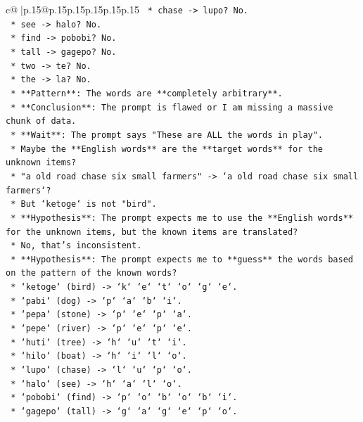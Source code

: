 \documentclass{article}
\begin{document}
{\begin{supertabular}{c@{$\;$}|p{.15\linewidth}@{}p{.15\linewidth}p{.15\linewidth}p{.15\linewidth}p{.15\linewidth}p{.15\linewidth}}
{{{\texttt{    *   chase {-}> lupo? No.} \\
\texttt{    *   see {-}> halo? No.} \\
\texttt{    *   find {-}> pobobi? No.} \\
\texttt{    *   tall {-}> gagepo? No.} \\
\texttt{    *   two {-}> te? No.} \\
\texttt{    *   the {-}> la? No.} \\
\texttt{    *   **Pattern**: The words are **completely arbitrary**.} \\
\texttt{    *   **Conclusion**: The prompt is flawed or I am missing a massive chunk of data.} \\
\texttt{    *   **Wait**: The prompt says "These are ALL the words in play".} \\
\texttt{    *   Maybe the **English words** are the **target words** for the unknown items?} \\
\texttt{    *   "a old road chase six small farmers" {-}> `a old road chase six small farmers`?} \\
\texttt{    *   But `ketoge` is not "bird".} \\
\texttt{    *   **Hypothesis**: The prompt expects me to use the **English words** for the unknown items, but the known items are translated?} \\
\texttt{    *   No, that's inconsistent.} \\
\texttt{    *   **Hypothesis**: The prompt expects me to **guess** the words based on the pattern of the known words?} \\
\texttt{    *   `ketoge` (bird) {-}> `k` `e` `t` `o` `g` `e`.} \\
\texttt{    *   `pabi` (dog) {-}> `p` `a` `b` `i`.} \\
\texttt{    *   `pepa` (stone) {-}> `p` `e` `p` `a`.} \\
\texttt{    *   `pepe` (river) {-}> `p` `e` `p` `e`.} \\
\texttt{    *   `huti` (tree) {-}> `h` `u` `t` `i`.} \\
\texttt{    *   `hilo` (boat) {-}> `h` `i` `l` `o`.} \\
\texttt{    *   `lupo` (chase) {-}> `l` `u` `p` `o`.} \\
\texttt{    *   `halo` (see) {-}> `h` `a` `l` `o`.} \\
\texttt{    *   `pobobi` (find) {-}> `p` `o` `b` `o` `b` `i`.} \\
\texttt{    *   `gagepo` (tall) {-}> `g` `a` `g` `e` `p` `o`.} \\
}}}
\end{supertabular}}
\end{document}
